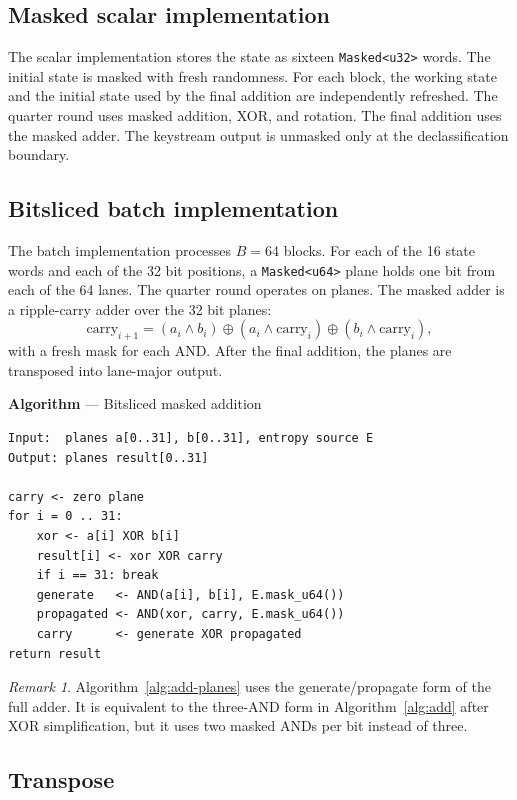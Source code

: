 \documentclass[11pt,a4paper]{article}
\newcommand{\code}[1]{\texttt{#1}}
\theoremstyle{plain}
\theoremstyle{definition}
\theoremstyle{remark}
\newtheorem{remark}[theorem]{Remark}
\newcounter{algblock}
\newenvironment{algorithmblock}[1]{%
  \par\medskip\refstepcounter{algblock}%
  \noindent\textbf{Algorithm \thealgblock} --- #1\par\nopagebreak
  \noindent\begin{minipage}{\linewidth}\small
}{%
  \end{minipage}\par\medskip
}
\begin{document}
\subsection{Masked scalar implementation}

The scalar implementation stores the state as sixteen \code{Masked<u32>} words. The
initial state is masked with fresh randomness. For each block, the working state and
the initial state used by the final addition are independently refreshed. The quarter
round uses masked addition, XOR, and rotation. The final addition uses the masked
adder. The keystream output is unmasked only at the declassification boundary.

\subsection{Bitsliced batch implementation}

The batch implementation processes \(B=64\) blocks. For each of the 16 state words and
each of the 32 bit positions, a \code{Masked<u64>} plane holds one bit from each of the
64 lanes. The quarter round operates on planes. The masked adder is a ripple-carry
adder over the 32 bit planes:
\[
  \text{carry}_{i+1} =
  (a_i\wedge b_i)\oplus(a_i\wedge \text{carry}_i)\oplus(b_i\wedge \text{carry}_i),
\]
with a fresh mask for each AND. After the final addition, the planes are transposed
into lane-major output.

\begin{algorithmblock}{Bitsliced masked addition}\label{alg:add-planes}
\begin{verbatim}
Input:  planes a[0..31], b[0..31], entropy source E
Output: planes result[0..31]

carry <- zero plane
for i = 0 .. 31:
    xor <- a[i] XOR b[i]
    result[i] <- xor XOR carry
    if i == 31: break
    generate   <- AND(a[i], b[i], E.mask_u64())
    propagated <- AND(xor, carry, E.mask_u64())
    carry      <- generate XOR propagated
return result
\end{verbatim}
\end{algorithmblock}

\begin{remark}
Algorithm~\ref{alg:add-planes} uses the generate/propagate form of the full adder.
It is equivalent to the three-AND form in Algorithm~\ref{alg:add} after XOR
simplification, but it uses two masked ANDs per bit instead of three.
\end{remark}

\subsection{Transpose}
\end{document}
